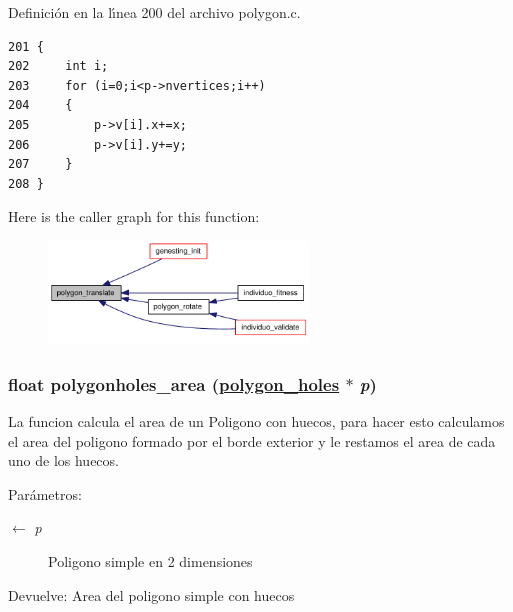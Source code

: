 Definici\'{o}n en la l\'{\i}nea 200 del archivo polygon.c.

\begin{Code}\begin{verbatim}201 {
202     int i;
203     for (i=0;i<p->nvertices;i++)
204     {
205         p->v[i].x+=x;
206         p->v[i].y+=y;
207     }
208 }
\end{verbatim}\end{Code}




Here is the caller graph for this function:\begin{figure}[H]
\begin{center}
\leavevmode
\includegraphics[width=196pt]{group__geometry_g7538c2bf0d1e8acc0cfc055b6bf3a96b_g7538c2bf0d1e8acc0cfc055b6bf3a96b_icgraph}
\end{center}
\end{figure}
\hypertarget{group__geometry_g380cdcfa6caf51828c8d06f4518a4084_g380cdcfa6caf51828c8d06f4518a4084}{
\subsubsection[polygonholes\_\-area]{\setlength{\rightskip}{0pt plus 5cm}float polygonholes\_\-area (\hyperlink{struct__polygon__holes}{polygon\_\-holes} $\ast$ {\em p})}}
\label{group__geometry_g380cdcfa6caf51828c8d06f4518a4084_g380cdcfa6caf51828c8d06f4518a4084}


La funcion calcula el area de un Poligono con huecos, para hacer esto calculamos el area del poligono formado por el borde exterior y le restamos el area de cada uno de los huecos.

\begin{Desc}
\item[Par\'{a}metros:]
\begin{description}
\item[\mbox{$\leftarrow$} {\em p}]Poligono simple en 2 dimensiones \end{description}
\end{Desc}
\begin{Desc}
\item[Devuelve:]Area del poligono simple con huecos \end{Desc}


